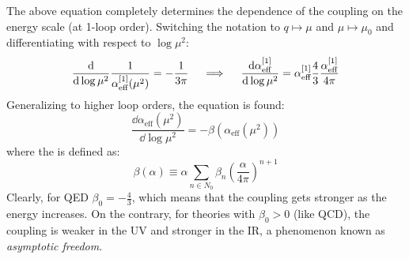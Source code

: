 The above equation completely determines the dependence of the coupling on the energy scale (at 1-loop order). Switching the notation to $ q \mapsto \mu $ and $ \mu \mapsto \mu_0 $ and differentiating with respect to $ \log \mu^2 $:
\begin{equation*}
  \frac{\mathrm{d}}{\mathrm{d} \log \mu^2} \frac{1}{\alpha_\text{eff}^{[1]}(\mu^2)} = - \frac{1}{3\pi}
  \quad \implies \quad
  \frac{\mathrm{d} \alpha_\text{eff}^{[1]}}{\mathrm{d} \log \mu^2} = \alpha_\text{eff}^{[1]} \frac{4}{3} \frac{\alpha_\text{eff}^{[1]}}{4\pi}
\end{equation*}
Generalizing to higher loop orders, the  equation is found:
\begin{equation}
  \frac{\dd \alpha_\text{eff}(\mu^2)}{\dd \log \mu^2} = - \beta(\alpha_\text{eff}(\mu^2))
\end{equation}
where the  is defined as:
\begin{equation}
  \beta(\alpha) \equiv \alpha \sum_{n \in N_0} \beta_n \left( \frac{\alpha}{4\pi} \right)^{n + 1}
\end{equation}
Clearly, for QED $ \beta_0 = - \frac{4}{3} $, which means that the coupling gets stronger as the energy increases. On the contrary, for theories with $ \beta_0 > 0 $ (like QCD), the coupling is weaker in the UV and stronger in the IR, a phenomenon known as \emph{asymptotic freedom}.

